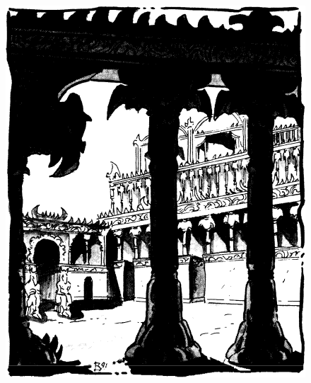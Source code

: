 \begin{figure}[b!]
\centering
\includegraphics[width=\columnwidth]{images/nibenay-1.png}
\end{figure}

